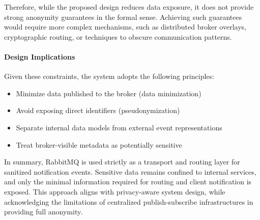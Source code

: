 Therefore, while the proposed design reduces data exposure, it does not provide strong anonymity guarantees in the formal sense. Achieving such guarantees would require more complex mechanisms, such as distributed broker overlays, cryptographic routing, or techniques to obscure communication patterns.

\paragraph{Design Implications}

Given these constraints, the system adopts the following principles:
\begin{itemize}
    \item Minimize data published to the broker (data minimization)
    \item Avoid exposing direct identifiers (pseudonymization)
    \item Separate internal data models from external event representations
    \item Treat broker-visible metadata as potentially sensitive
\end{itemize}

In summary, RabbitMQ is used strictly as a transport and routing layer for sanitized notification events. Sensitive data remains confined to internal services, and only the minimal information required for routing and client notification is exposed. This approach aligns with privacy-aware system design, while acknowledging the limitations of centralized publish-subscribe infrastructures in providing full anonymity.

